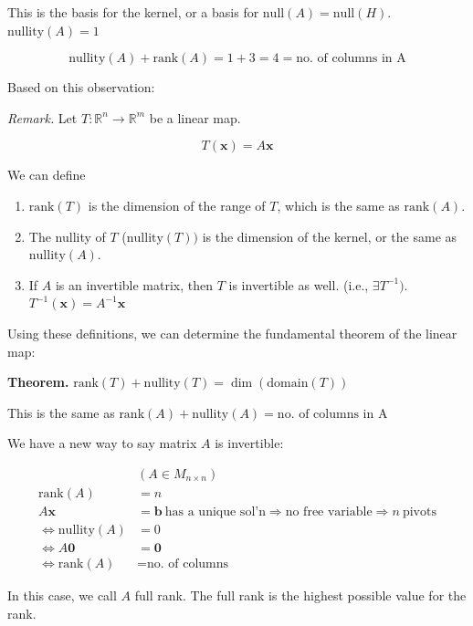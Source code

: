 \documentclass[
]{article}
\begin{document}
This is the basis for the kernel, or a basis for
$\text{null}{(A)} = \text{null}(H)$. $\text{nullity}{(A)} = 1$

$$\text{nullity}(A) + \text{rank}(A) = 1 + 3 = 4 = \text{no.\ of\ columns\ in\ A}$$

Based on this observation:

\emph{Remark.} Let $T:\mathbb{R}^{n} \rightarrow \mathbb{R}^{m}$ be a
linear map.

$$T\left( \mathbf{x} \right) = A\mathbf{x}$$

We can define

\begin{enumerate}
\def\labelenumi{\arabic{enumi}.}
\item
  $\text{rank}(T)$ is the dimension of the range of $T$, which is
  the same as $\text{rank}(A)$.
\item
  The nullity of $T$ ($\text{nullity}{(T)})$ is the dimension of the
  kernel, or the same as $\text{nullity}{(A)}$.
\item
  If $A$ is an invertible matrix, then $T$ is invertible as well.
  (i.e., $\exists T^{- 1})$.
  $T^{- 1}\left( \mathbf{x} \right) = A^{- 1}\mathbf{x}$
\end{enumerate}

Using these definitions, we can determine the fundamental theorem of the
linear map:

\textbf{Theorem.}
$\text{rank}(T) + \text{nullity}{(T)} = \dim\left( \text{domain}(T) \right)$

This is the same as
$\text{rank}(A) + \text{nullity}{(A)} = \text{no.\ of\ columns\ in\ A}$

We have a new way to say matrix $A$ is invertible:

\begin{align*}
&\left( A \in M_{n \times n} \right)
 \\
\text{rank}(A) &= n
 \\
A\mathbf{x} &= \mathbf{b}\ \text{has\ a\ unique\ sol'n} \Rightarrow \text{no\ free\ variable} \Rightarrow n\ \text{pivots}
 \\
\Leftrightarrow \text{nullity}(A) &= 0
 \\
\Leftrightarrow A\mathbf{0} &= \mathbf{0}
 \\
\Leftrightarrow \text{rank}(A) &= \text{no.\ of\ columns}
\end{align*}


In this case, we call $A$ full rank. The full rank is the highest
possible value for the rank.
\end{document}

